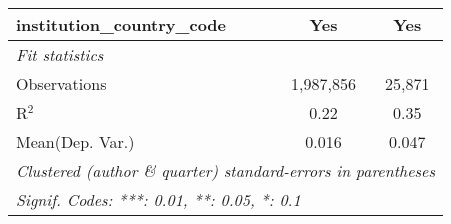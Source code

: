\begin{tabular}{lcc}
   institution\_country\_code                                 & Yes            & Yes\\  
   \midrule
   \emph{Fit statistics}\\
   Observations                                               & 1,987,856      & 25,871\\  
   R$^2$                                                      & 0.22           & 0.35\\  
Mean(Dep. Var.) & 0.016 & 0.047 \\
   \midrule \midrule
   \multicolumn{3}{l}{\emph{Clustered (author \& quarter) standard-errors in parentheses}}\\
   \multicolumn{3}{l}{\emph{Signif. Codes: ***: 0.01, **: 0.05, *: 0.1}}\\
\end{tabular}
\par\endgroup
